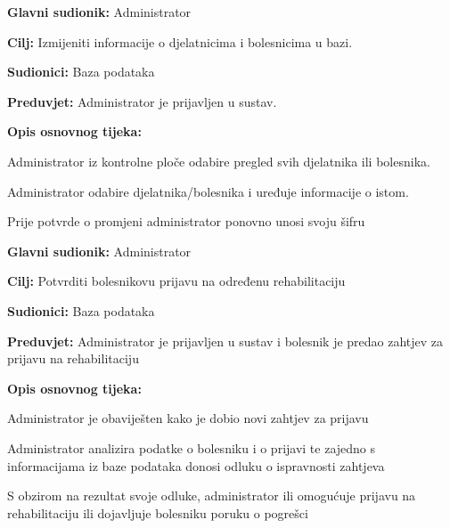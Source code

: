 	\item \textbf{Glavni sudionik:} Administrator
	\item \textbf{Cilj:} Izmijeniti informacije o djelatnicima i bolesnicima u bazi.
	\item \textbf{Sudionici:} Baza podataka
	\item \textbf{Preduvjet:} Administrator je prijavljen u sustav.
	\item \textbf{Opis osnovnog tijeka:}
	\begin{packed_enum}
		\item Administrator iz kontrolne ploče odabire pregled svih djelatnika ili bolesnika.
		\item Administrator odabire djelatnika/bolesnika i uređuje informacije o istom.
        	\item Prije potvrde o promjeni administrator ponovno unosi svoju šifru
	\end{packed_enum}
\closeusecase


	\item \textbf{Glavni sudionik:} Administrator
 	\item \textbf{Cilj:} Potvrditi bolesnikovu prijavu na određenu rehabilitaciju
  	\item \textbf{Sudionici:} Baza podataka
   	\item \textbf{Preduvjet:} Administrator je prijavljen u sustav i bolesnik je predao zahtjev za prijavu na rehabilitaciju
    	\item \textbf{Opis osnovnog tijeka:}
     	\begin{packed_enum}
      		\item Administrator je obaviješten kako je dobio novi zahtjev za prijavu
		\item Administrator analizira podatke o bolesniku i o prijavi te zajedno s informacijama iz baze podataka donosi odluku o ispravnosti zahtjeva
  		\item S obzirom na rezultat svoje odluke, administrator ili omogućuje prijavu na rehabilitaciju ili dojavljuje bolesniku poruku o pogrešci
    	\end{packed_enum}
\closeusecase


